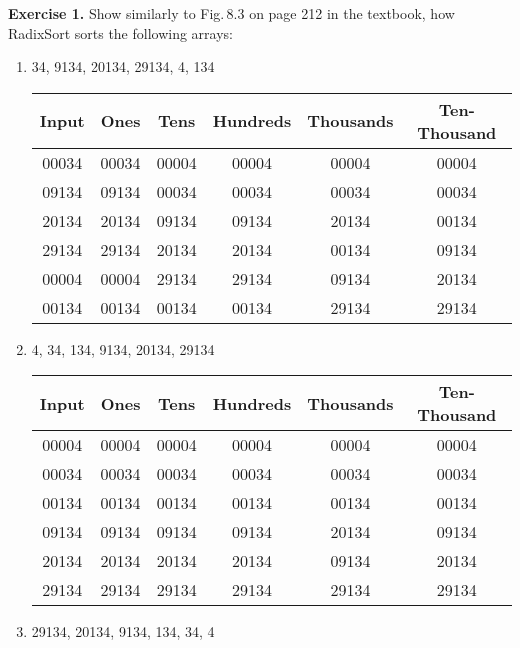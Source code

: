 \documentclass[11pt]{article}
\begin{document}
\textbf{Exercise 1.} Show similarly to Fig.\,8.3 on page 212 in the textbook, how \textsf{RadixSort} sorts the following arrays:

\begin{enumerate}

\item 34, 9134, 20134, 29134, 4, 134

\begin{center}
\begin{tabular}{|c c c c c c|}
 \hline
 Input     & Ones      & Tens      & Hundreds  & Thousands  & Ten-Thousand \\
 \hline\hline
 00034 & 00034 & 00004 & 00004 & 00004 & 00004 \\
 09134 & 09134 & 00034 & 00034 & 00034 & 00034 \\
 20134 & 20134 & 09134 & 09134 & 20134 & 00134 \\
 29134 & 29134 & 20134 & 20134 & 00134 & 09134 \\
 00004 & 00004 & 29134 & 29134 & 09134 & 20134 \\
 00134 & 00134 & 00134 & 00134 & 29134 & 29134 \\
 \hline
\end{tabular}
\end{center}

\item 4, 34, 134, 9134, 20134, 29134

\begin{center}
\begin{tabular}{|c c c c c c|}
 \hline
 Input     & Ones      & Tens      & Hundreds  & Thousands  & Ten-Thousand \\
 \hline\hline
 00004 & 00004 & 00004 & 00004 & 00004 & 00004 \\
 00034 & 00034 & 00034 & 00034 & 00034 & 00034 \\
 00134 & 00134 & 00134 & 00134 & 00134 & 00134 \\
 09134 & 09134 & 09134 & 09134 & 20134 & 09134 \\
 20134 & 20134 & 20134 & 20134 & 09134 & 20134 \\
 29134 & 29134 & 29134 & 29134 & 29134 & 29134 \\
 \hline
\end{tabular}
\end{center}

\item 29134, 20134, 9134, 134, 34, 4


\end{enumerate}
\end{document}
